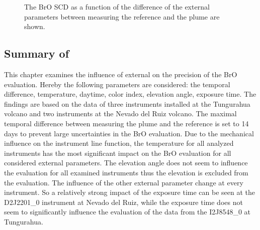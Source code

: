 \documentclass  [
  paper    = a4,
  BCOR     = 10mm,
  twoside,
  fontsize = 12pt,
  fleqn,
  toc      = bibnumbered,
  toc      = listofnumbered,
  numbers  = noendperiod,
  headings = normal,
  listof   = leveldown,
  version  = 3.03
]                                       {scrreprt}
\begin{document}
\begin{figure}
{	}
	\caption{The BrO SCD as a function of the difference of the external parameters between measuring the reference and the plume are shown.}
	\label{fig:difftempbroallinstruments}
\end{figure}
\FloatBarrier
\subsection*{Summary of }
This chapter examines the influence of external on the precision of the BrO evaluation. Hereby the following parameters are considered: 
the temporal difference, temperature, daytime, color index, elevation angle, exposure time.  The findings are based on the data of three instruments installed at the Tungurahua volcano and two instruments at the Nevado del Ruiz volcano. The maximal temporal difference between measuring the plume and the reference is set to 14 days to prevent large uncertainties in the BrO evaluation. Due to the mechanical influence on the instrument line function, the temperature for all analyzed instruments has the most significant impact on the BrO evaluation for all considered external parameters. The elevation angle does not seem to influence the evaluation for all examined instruments thus the elevation is excluded from the evaluation. The influence of the other external parameter change at every instrument. So a relatively strong impact of the exposure time can be seen at the D2J2201\_0 instrument at Nevado del Ruiz, while the exposure time does not seem to significantly influence the evaluation of the data from the  I2J8548\_0 at Tungurahua. 
\end{document}

